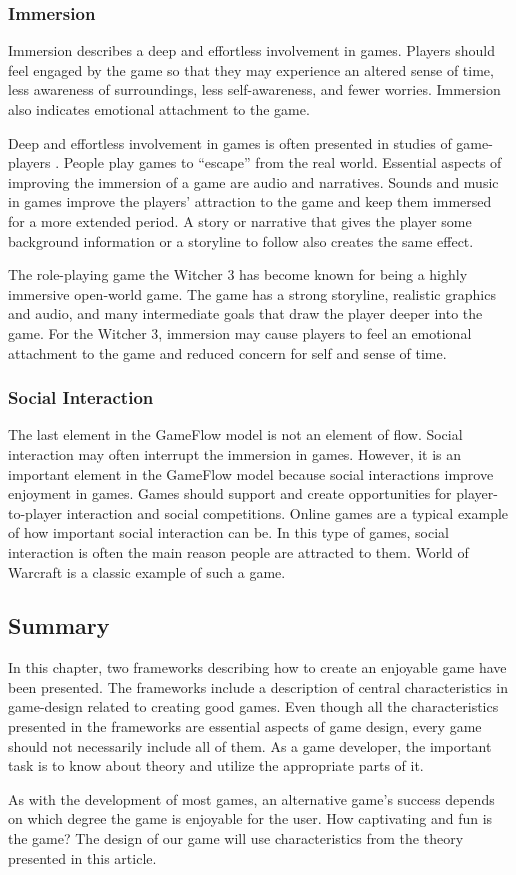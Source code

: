 \documentclass[../Main.tex]{subfiles}
\begin{document}
\subsubsection{Immersion}
Immersion describes a deep and effortless involvement in games. Players should feel engaged by the game so that they may experience an altered sense of time, less awareness of surroundings, less self-awareness, and fewer worries. Immersion also indicates emotional attachment to the game.

Deep and effortless involvement in games is often presented in studies of game-players \citep{johnson_effective_2003}. People play games to “escape” from the real world. Essential aspects of improving the immersion of a game are audio and narratives. Sounds and music in games improve the players’ attraction to the game and keep them immersed for a more extended period. A story or narrative that gives the player some background information or a storyline to follow also creates the same effect.

The role-playing game the Witcher 3 has become known for being a highly immersive open-world game. The game has a strong storyline, realistic graphics and audio, and many intermediate goals that draw the player deeper into the game. For the Witcher 3, immersion may cause players to feel an emotional attachment to the game and reduced concern for self and sense of time.

\subsubsection{Social Interaction}
The last element in the GameFlow model is not an element of flow. Social interaction may often interrupt the immersion in games. However, it is an important element in the GameFlow model because social interactions improve enjoyment in games. Games should support and create opportunities for player-to-player interaction and social competitions. Online games are a typical example of how important social interaction can be. In this type of games, social interaction is often the main reason people are attracted to them. World of Warcraft is a classic example of such a game.

\subsection{Summary}
In this chapter, two frameworks describing how to create an enjoyable game have been presented. The frameworks include a description of central characteristics in game-design related to creating good games. Even though all the characteristics presented in the frameworks are essential aspects of game design, every game should not necessarily include all of them. As a game developer, the important task is to know about theory and utilize the appropriate parts of it.

As with the development of most games, an alternative game’s success depends on which degree the game is enjoyable for the user. How captivating and fun is the game? The design of our game will use characteristics from the theory presented in this article.

\biblio %
\end{document}

